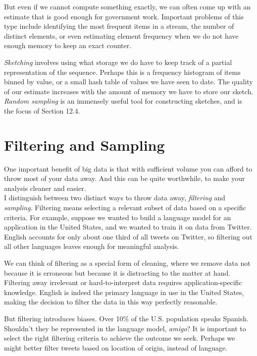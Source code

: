 \documentclass[10pt]{article}
\begin{document}
\begin{enumerate}
But even if we cannot compute something exactly, we can often come up with an estimate that is good enough for government work. Important problems of this type include identifying the most frequent items in a stream, the number of distinct elements, or even estimating element frequency when we do not have enough memory to keep an exact counter.

\textit{Sketching} involves using what storage we do have to keep track of a partial representation of the sequence. Perhaps this is a frequency histogram of items binned by value, or a small hash table of values we have seen to date. The quality of our estimate increases with the amount of memory we have to store our sketch. \textit{Random sampling} is an immensely useful tool for constructing sketches, and is the focus of Section 12.4.

\section{Filtering and Sampling}
One important benefit of big data is that with sufficient volume you can afford to throw most of your data away. And this can be quite worthwhile, to make your analysis cleaner and easier.\\
I distinguish between two distinct ways to throw data away, \textit{filtering} and \textit{sampling}. Filtering means selecting a relevant subset of data based on a specific criteria. For example, suppose we wanted to build a language model for an application in the United States, and we wanted to train it on data from Twitter. English accounts for only about one third of all tweets on Twitter, so filtering out all other languages leaves enough for meaningful analysis.

We can think of filtering as a special form of cleaning, where we remove data not because it is erroneous but because it is distracting to the matter at hand. Filtering away irrelevant or hard-to-interpret data requires application-specific knowledge. English is indeed the primary language in use in the United States, making the decision to filter the data in this way perfectly reasonable.

But filtering introduces biases. Over 10\% of the U.S. population speaks Spanish. Shouldn't they be represented in the language model, \textit{amigo}? It is important to select the right filtering criteria to achieve the outcome we seek. Perhaps we might better filter tweets based on location of origin, instead of language.


\end{enumerate}
\end{document}
